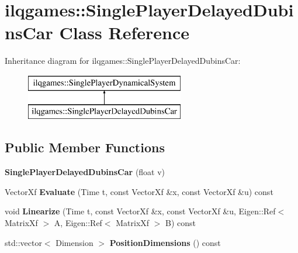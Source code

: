 \hypertarget{classilqgames_1_1_single_player_delayed_dubins_car}{}\section{ilqgames\+:\+:Single\+Player\+Delayed\+Dubins\+Car Class Reference}
\label{classilqgames_1_1_single_player_delayed_dubins_car}
Inheritance diagram for ilqgames\+:\+:Single\+Player\+Delayed\+Dubins\+Car\+:\begin{figure}[H]
\begin{center}
\leavevmode
\includegraphics[height=2.000000cm]{classilqgames_1_1_single_player_delayed_dubins_car}
\end{center}
\end{figure}
\subsection*{Public Member Functions}
\begin{DoxyCompactItemize}
\item 
{\bfseries Single\+Player\+Delayed\+Dubins\+Car} (float v)\hypertarget{classilqgames_1_1_single_player_delayed_dubins_car_aa6ba6ca3a5e0b6c80d9199e2c12ced47}{}\label{classilqgames_1_1_single_player_delayed_dubins_car_aa6ba6ca3a5e0b6c80d9199e2c12ced47}

\item 
Vector\+Xf {\bfseries Evaluate} (Time t, const Vector\+Xf \&x, const Vector\+Xf \&u) const \hypertarget{classilqgames_1_1_single_player_delayed_dubins_car_a6540f0ba900dfd2e49e920a066646a39}{}\label{classilqgames_1_1_single_player_delayed_dubins_car_a6540f0ba900dfd2e49e920a066646a39}

\item 
void {\bfseries Linearize} (Time t, const Vector\+Xf \&x, const Vector\+Xf \&u, Eigen\+::\+Ref$<$ Matrix\+Xf $>$ A, Eigen\+::\+Ref$<$ Matrix\+Xf $>$ B) const \hypertarget{classilqgames_1_1_single_player_delayed_dubins_car_a312c7025e8cdfb8baf7bc448c96d2047}{}\label{classilqgames_1_1_single_player_delayed_dubins_car_a312c7025e8cdfb8baf7bc448c96d2047}

\item 
std\+::vector$<$ Dimension $>$ {\bfseries Position\+Dimensions} () const \hypertarget{classilqgames_1_1_single_player_delayed_dubins_car_aa6e368f3b2235bda5adbe5b0e5337c2e}{}\label{classilqgames_1_1_single_player_delayed_dubins_car_aa6e368f3b2235bda5adbe5b0e5337c2e}

\end{DoxyCompactItemize}
